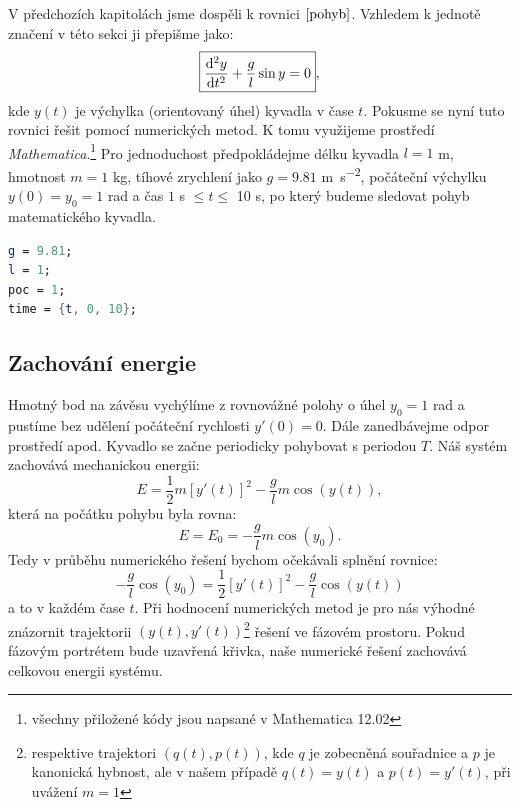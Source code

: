 V předchozích kapitolách jsme dospěli k rovnici $\eqref{pohyb}$. Vzhledem k jednotě značení v této sekci ji přepišme jako:
\begin{equation}
\label{rovnice}
\boxed{\frac{\mathrm{d}^{2} y}{\mathrm{d} t ^{2}} + \frac{g}{l}\sin y=0},
\end{equation}
kde $y(t)$ je výchylka (orientovaný úhel) kyvadla v čase $t$.
Pokusme se nyní tuto rovnici řešit pomocí numerických metod. K tomu využijeme prostředí \textit{Mathematica}.\footnote{všechny přiložené kódy jsou napsané v Mathematica 12.02}
Pro jednoduchost předpokládejme délku kyvadla $l=1$ \si{m}, hmotnost $m = 1$ \si{kg}, tíhové zrychlení jako $g = 9.81$ \si{m.s^{-2}}, počáteční výchylku $y(0)=y_{0}=1$ \si{rad} a čas $1$ \si{s} $\leq t \leq$ 10 \si{s}, po který budeme sledovat pohyb matematického kyvadla.
\begin{lstlisting}[language=Mathematica, caption=Konstanty]
g = 9.81;
l = 1;
poc = 1;
time = {t, 0, 10};
\end{lstlisting}

\subsection{Zachování energie}
\label{sec:Zachování energie}
Hmotný bod na závěsu vychýlíme z rovnovážné polohy o úhel $y_{0}=1$ \si{rad} a pustíme bez udělení počáteční rychlosti $y'(0)=0$. Dále zanedbávejme odpor prostředí apod. Kyvadlo se začne periodicky pohybovat s periodou $T$. Náš systém zachovává mechanickou energii:
\begin{equation}
E = \frac{1}{2} m [y'(t)]^{2}- \frac{g}{l} m \cos(y(t)),
\end{equation} 
která na počátku pohybu byla rovna:
\begin{equation}
E = E_{0} = - \frac{g}{l} m \cos(y_{0}).
\end{equation} 
Tedy v průběhu numerického řešení bychom očekávali splnění rovnice:
\begin{equation}
\label{ener}
\boxed{- \frac{g}{l}  \cos(y_{0}) = \frac{1}{2} [y'(t)]^{2} - \frac{g}{l} \cos(y(t))}
\end{equation} 
a to v každém čase $t$. Při hodnocení numerických metod je pro nás výhodné znázornit trajektorii $(y(t),y'(t))$\footnote{respektive trajektori $(q(t),p(t))$, kde $q$ je zobecněná souřadnice a $p$ je kanonická hybnost, ale v našem případě $q(t)=y(t)$ a $p(t)=y'(t)$, při uvážení $m=1$} řešení ve fázovém prostoru. Pokud fázovým portrétem bude uzavřená křivka, naše numerické řešení zachovává celkovou energii systému.

